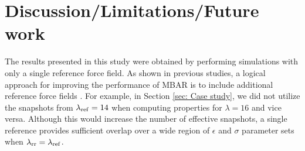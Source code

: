 \documentclass[journal=jced,manuscript=article]{achemso}
\begin{document}

\section{Discussion/Limitations/Future work} \label{sec: Discussion}

The results presented in this study were obtained by performing simulations with only a single reference force field. As shown in previous studies, a logical approach for improving the performance of MBAR is to include additional reference force fields \cite{Postdoc_1,Postdoc_2}. For example, in Section \ref{sec: Case study}, we did not utilize the snapshots from $\lambda_{\rm ref} = 14$ when computing properties for $\lambda = 16$ and vice versa. Although this would increase the number of effective snapshots, a single reference provides sufficient overlap over a wide region of $\epsilon$ and $\sigma$ parameter sets when $\lambda_{\rm rr} = \lambda_{\rm ref}$. 


\end{document}
